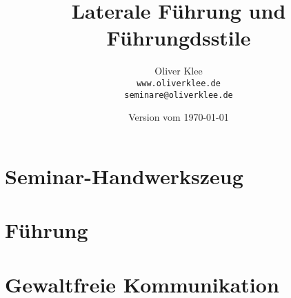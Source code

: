 \documentclass[a4paper,openany,twoside,titlepage,10pt,headsepline]{scrbook}
\title{Laterale Führung und Führungdsstile}
\author{Oliver Klee\\\texttt{www.oliverklee.de}\\\texttt{seminare@oliverklee.de}}
\date{Version vom \today}
\begin{document}
\frontmatter

\maketitle

\tableofcontents


\mainmatter

\chapter{Seminar-Handwerkszeug}





\chapter{Führung}












\chapter{Gewaltfreie Kommunikation}




\backmatter





\printindex
\end{document}
